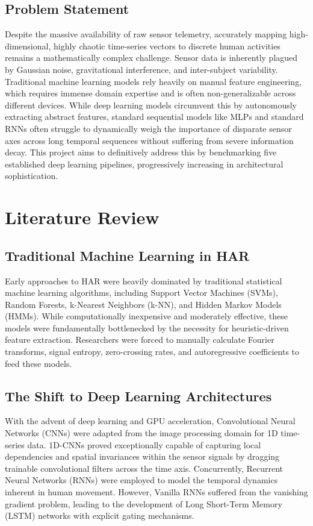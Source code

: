 \documentclass[12pt,a4paper]{article}
\begin{document}
\subsection{Problem Statement}
Despite the massive availability of raw sensor telemetry, accurately mapping high-dimensional, highly chaotic time-series vectors to discrete human activities remains a mathematically complex challenge. Sensor data is inherently plagued by Gaussian noise, gravitational interference, and inter-subject variability. Traditional machine learning models rely heavily on manual feature engineering, which requires immense domain expertise and is often non-generalizable across different devices. While deep learning models circumvent this by autonomously extracting abstract features, standard sequential models like MLPs and standard RNNs often struggle to dynamically weigh the importance of disparate sensor axes across long temporal sequences without suffering from severe information decay. This project aims to definitively address this by benchmarking five established deep learning pipelines, progressively increasing in architectural sophistication.

\newpage
\section{Literature Review}
\subsection{Traditional Machine Learning in HAR}
Early approaches to HAR were heavily dominated by traditional statistical machine learning algorithms, including Support Vector Machines (SVMs), Random Forests, k-Nearest Neighbors (k-NN), and Hidden Markov Models (HMMs). While computationally inexpensive and moderately effective, these models were fundamentally bottlenecked by the necessity for heuristic-driven feature extraction. Researchers were forced to manually calculate Fourier transforms, signal entropy, zero-crossing rates, and autoregressive coefficients to feed these models.

\subsection{The Shift to Deep Learning Architectures}
With the advent of deep learning and GPU acceleration, Convolutional Neural Networks (CNNs) were adapted from the image processing domain for 1D time-series data. 1D-CNNs proved exceptionally capable of capturing local dependencies and spatial invariances within the sensor signals by dragging trainable convolutional filters across the time axis. Concurrently, Recurrent Neural Networks (RNNs) were employed to model the temporal dynamics inherent in human movement. However, Vanilla RNNs suffered from the vanishing gradient problem, leading to the development of Long Short-Term Memory (LSTM) networks with explicit gating mechanisms.
\end{document}
